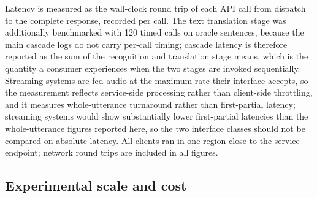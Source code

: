 Latency is measured as the wall-clock round trip of each API call from
dispatch to the complete response, recorded per call. The text translation
stage was additionally benchmarked with 120 timed calls on
oracle sentences, because the main cascade logs do not carry per-call
timing; cascade latency is therefore reported as the sum of the recognition
and translation stage means, which is the quantity a consumer experiences
when the two stages are invoked sequentially. Streaming systems are fed
audio at the maximum rate their interface accepts, so the measurement
reflects service-side processing rather than client-side throttling, and it
measures whole-utterance turnaround rather than first-partial latency;
streaming systems would show substantially lower first-partial latencies
than the whole-utterance figures reported here, so the two interface
classes should not be compared on absolute latency. All clients ran in one
region close to the service endpoint; network round trips are included in
all figures.

\subsection{Experimental scale and cost}

